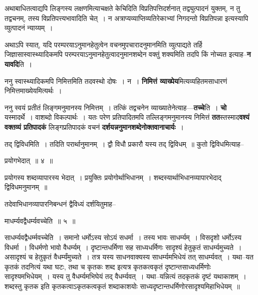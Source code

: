\documentclass[article,12pt,a4paper]{memoir}
\begin{document}
	  \pstart अथाबाधितत्वाद्यपि लिङ्गस्य लक्षणमित्याचक्षते केचिदिति विप्रतिपत्तिदर्शनात् तद्व्युत्पादनं युक्तम्, न तु तद्वचनम्, तस्य विप्रतिपत्त्यभावादिति चेत् । न अत्राप्यव्याप्तिव्यतिरेकाभ्यां निगदन्तो विप्रतिपन्ना इत्यस्यापि व्युत्पादनं न्याय्यम् ।
	\pend
      

	  \pstart अथाऽपि स्यात्, यदि परम्परयाऽनुमानहेतुत्वेन वचनमुपचारादनुमानमिति व्युत्पाद्यते तर्हि जिज्ञासास्वास्थ्यादिकमपि परम्परयाऽनुमानहेतुत्वादनुमानशब्देन वक्तुं शक्यमिति तदपि किं नोच्यत इत्याह--\textbf{न यावदि}ति ।
	\pend
      

	  \pstart ननु स्वास्थ्यादिकमपि निमित्तमिति तदवस्थो दोषः । न । \textbf{निमित्तं व्याख्पेय}मित्यव्यहितमसाधारणं निमित्तमाख्येयमित्यर्थः ।
	\pend
      

	  \pstart ननु स्वयं प्रतीतं लिङ्गमनुमानस्य निमित्तम् । तत्किं तद्वचनेन व्याख्यातेनेत्याह—\textbf{तच्चे}ति । \textbf{चो} यस्मादर्थे । वाशब्दो विकल्पार्थः । यतः परेण प्रतिपादितमपि तल्लिङ्गमनुमानस्य निमित्तं \textbf{तत}स्तस्माद\textbf{वश्यं वक्तव्यं प्र}\leavevmode{}\textbf{तिपादकं} लिङ्गप्रतिपादकं वचनं \textbf{दर्शयन्ननुमानशब्देनोक्तवानाचार्यः} ।
	\pend
	  \bigskip
	  \begingroup
	

	  \pstart तद् द्विविधमिति । तदिति परार्थानुमानम् । द्वौ विधौ प्रकारौ यस्य तद् द्विविधम् ॥ कुतो द्विविधमित्याह--
	\pend
        
	  \bigskip
	  \begingroup
	

	  \pstart प्रयोगभेदात् ॥ ४ ॥
	\pend
      
	  \endgroup
	 

	  \pstart प्रयोगस्य शब्दव्यापारस्य भेदात् । प्रयुक्तिः प्रयोगोर्थाभिधानम् । शब्दस्यार्थाभिधानव्यापारभेदाद् द्विविधमनुमानम् ॥
	\pend
        

	  \pstart तदेवाभिधानव्यापारनिबन्धनं द्वैविध्यं दर्शयितुमाह--
	\pend
        
	  \bigskip
	  \begingroup
	

	  \pstart माधर्म्यवद्वैधर्म्यवच्चेति ॥ ५ ॥
	\pend
      
	  \endgroup
	 

	  \pstart साधर्म्यवद्वैधर्म्मवच्चेति । समानो धर्मोऽस्य सोऽयं सधर्मा । तस्य भावः साधर्म्यम् । विसदृशो धर्मोऽस्य विधर्मा । विधर्मणो भावो वैधर्म्यम् । दृष्टान्तधर्मिणा सह साध्यधर्मिणः सादृश्यं हेतुकृतं साधर्म्यमुच्यते । असादृश्यं च हेतुकृतं वैधर्म्यंमुच्यते । तत्र यस्य साधनवाक्यस्य साधर्म्यमभिधेयं तत् साधर्म्यवत् । यथा--यत कृतकं तदनित्यं यथा घटः, तथा च कृतकः शब्द इत्यत्र कृतकत्वकृतं दृष्टान्तसाध्यधर्मिणोः सादृश्यमभिधेयम् । यस्य तु वैधर्म्यमभिघेयं तद् वैधर्म्यवत् । यथा--यन्नित्यं तदकृतकं दृष्टं यथाकाशम् । शब्दस्तु कृतक इति कृतकत्वाऽकृतकत्वकृतं शब्दाकाशयोः साध्यदृष्टान्तधर्मिणोरसादृश्यमिहाभिधेयम् ॥
	\pend
        
\end{document}
